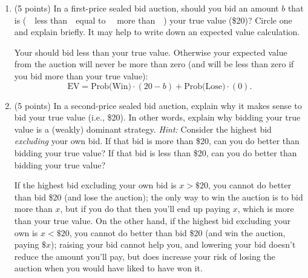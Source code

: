 \documentclass[twoside]{article}
\newcommand{\mybigskip}{\vspace{1in}}
\begin{document}
\begin{enumerate}
    \begin{enumerate}
    \item (5 points) In a first-price sealed bid auction, should you bid an amount $b$ that is (\ \ less than\ \ equal to \ \ more than\ \ ) your true value (\$20)? Circle one and explain briefly. It may help to write down an expected value calculation.
    \begin{EXAM}\clearpage\end{EXAM}

\begin{KEY}
Your should bid less than your true value. Otherwise your expected value from the auction will never be more than zero (and will be less than zero if you bid more than your true value):
\[
\mbox{EV}=\mbox{Prob(Win)}\cdot (20-b) + \mbox{Prob(Lose)}\cdot (0).
\]
\end{KEY}
    
    
    
    \item (5 points) In a second-price sealed bid auction, explain why it makes sense to bid your true value (i.e., \$20). In other words, explain why bidding your true value is a (weakly) dominant strategy. \emph{Hint: }Consider the highest bid \emph{excluding} your own bid. If that bid is more than \$20, can you do better than bidding your true value? If that bid is less than \$20, can you do better than bidding your true value?
    \begin{EXAM}\vspace{3in}\end{EXAM}
    
\begin{KEY}
If the highest bid excluding your own bid is $x>\$20$, you cannot do better than bid \$20 (and lose the auction); the only way to win the auction is to bid more than $x$, but if you do that then you'll end up paying $x$, which is more than your true value. On the other hand, if the highest bid excluding your own is $x<\$20$, you cannot do better than bid \$20 (and win the auction, paying $\$x$); raising your bid cannot help you, and lowering your bid doesn't reduce the amount you'll pay, but does increase your risk of losing the auction when you would have liked to have won it.
\end{KEY}






\end{enumerate}
\end{enumerate}
\end{document}

